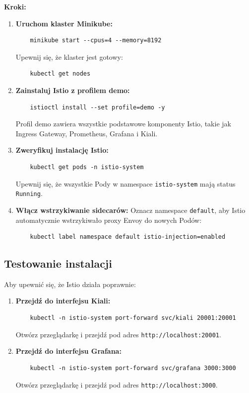 \documentclass{article}
\begin{document}
\textbf{Kroki:}
\begin{enumerate}
    \item \textbf{Uruchom klaster Minikube:}
    \begin{lstlisting}
    minikube start --cpus=4 --memory=8192
    \end{lstlisting}
    Upewnij się, że klaster jest gotowy:
    \begin{lstlisting}
    kubectl get nodes
    \end{lstlisting}

    \item \textbf{Zainstaluj Istio z profilem demo:}
    \begin{lstlisting}
    istioctl install --set profile=demo -y
    \end{lstlisting}
    Profil demo zawiera wszystkie podstawowe komponenty Istio, takie jak Ingress Gateway, Prometheus, Grafana i Kiali.

    \item \textbf{Zweryfikuj instalację Istio:}
    \begin{lstlisting}
    kubectl get pods -n istio-system
    \end{lstlisting}
    Upewnij się, że wszystkie Pody w namespace \texttt{istio-system} mają status \texttt{Running}.

    \item \textbf{Włącz wstrzykiwanie sidecarów:}
    Oznacz namespace \texttt{default}, aby Istio automatycznie wstrzykiwało proxy Envoy do nowych Podów:
    \begin{lstlisting}
    kubectl label namespace default istio-injection=enabled
    \end{lstlisting}
\end{enumerate}

\subsection{Testowanie instalacji}

Aby upewnić się, że Istio działa poprawnie:
\begin{enumerate}
    \item \textbf{Przejdź do interfejsu Kiali:}
    \begin{lstlisting}
    kubectl -n istio-system port-forward svc/kiali 20001:20001
    \end{lstlisting}
    Otwórz przeglądarkę i przejdź pod adres \texttt{http://localhost:20001}.
    \item \textbf{Przejdź do interfejsu Grafana:}
    \begin{lstlisting}
    kubectl -n istio-system port-forward svc/grafana 3000:3000
    \end{lstlisting}
    Otwórz przeglądarkę i przejdź pod adres \texttt{http://localhost:3000}.
\end{enumerate}
\end{document}
